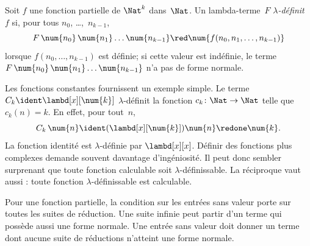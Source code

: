 \documentclass[../../../include/open-logic-section]{subfiles}
\begin{document}
\begin{defn}
Soit $f$ une fonction partielle de
$\Nat^k$ dans~$\Nat$. Un lambda-terme~$F$
\emph{$\lambda$-définit}~$f$ si, pour
tous $n_0$, \dots,~$n_{k-1}$,
\[
  F\,\num{n_0}\,\num{n_1}\dots\num{n_{k-1}}
  \red \num{f(n_0,n_1,\dots,n_{k-1})}
\]
lorsque $f(n_0,\dots,n_{k-1})$ est définie;
si cette valeur est indéfinie, le terme
$F\,\num{n_0}\,\num{n_1}\dots\num{n_{k-1}}$
n'a pas de forme normale.
\end{defn}

Les fonctions constantes fournissent
un exemple simple. Le terme
$C_k\ident\lambd[x][\num{k}]$
$\lambda$-définit la fonction
$c_k\colon\Nat\to\Nat$ telle que
$c_k(n)=k$. En effet, pour tout~$n$,
\[
  C_k\,\num{n}
  \ident(\lambd[x][\num{k}])\num{n}
  \redone\num{k}.
\]
La fonction identité est
$\lambda$-définie par $\lambd[x][x]$.
Définir des fonctions plus complexes
demande souvent davantage d'ingéniosité.
Il peut donc sembler surprenant que
toute fonction calculable soit
$\lambda$-définissable. La réciproque
vaut aussi : toute fonction
$\lambda$-définissable est calculable.

Pour une fonction partielle, la condition sur les entrées
sans valeur porte sur toutes les suites de réduction. Une
suite infinie peut partir d'un terme qui possède aussi une
forme normale. Une entrée sans valeur doit donner un terme
dont aucune suite de réductions n'atteint une forme normale.
\end{document}
